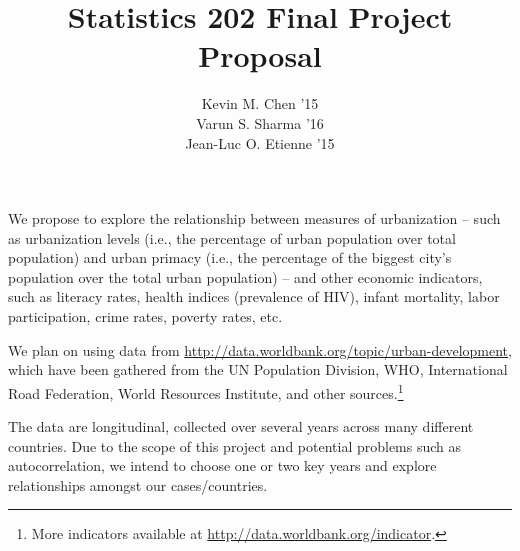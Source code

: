 \documentclass[12pt]{article}
\begin{document}
\doublespacing
\title{Statistics 202 Final Project Proposal}
\date{}
\author{Kevin M. Chen '15 \\ Varun S. Sharma '16 \\ Jean-Luc O. Etienne '15}

\maketitle

We propose to explore the relationship between measures of urbanization -- such as urbanization levels (i.e., the percentage of urban population over total population) and urban primacy (i.e., the percentage of the biggest city's population over the total urban population) -- and other economic indicators, such as 
literacy rates, 
health indices (prevalence of HIV), 
infant mortality, 
labor participation,
crime rates,
poverty rates, etc.

We plan on using data from \url{http://data.worldbank.org/topic/urban-development}, which have been gathered from the UN Population Division, WHO, International Road Federation, World Resources Institute, and other sources.\footnote{More indicators available at \url{http://data.worldbank.org/indicator}.}

The data are longitudinal, collected over several years across many different countries. Due to the scope of this project and potential problems such as autocorrelation, we intend to choose one or two key years and explore relationships amongst our cases/countries.
\end{document}
